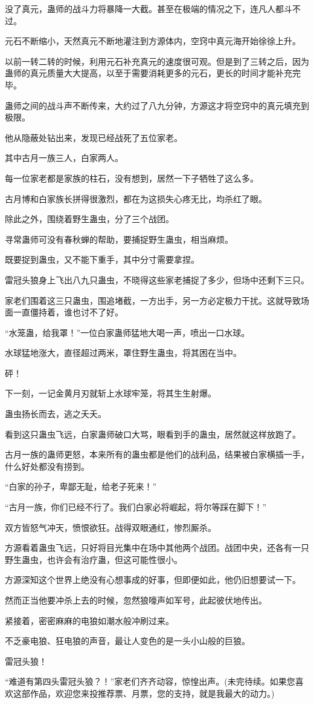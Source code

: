 \begin{this_body}
没了真元，蛊师的战斗力将暴降一大截。甚至在极端的情况之下，连凡人都斗不过。

元石不断缩小，天然真元不断地灌注到方源体内，空窍中真元海开始徐徐上升。

以前一转二转的时候，利用元石补充真元的速度很可观。但是到了三转之后，因为蛊师的真元质量大大提高，以至于需要消耗更多的元石，更长的时间才能补充完毕。

蛊师之间的战斗声不断传来，大约过了八九分钟，方源这才将空窍中的真元填充到极限。

他从隐蔽处钻出来，发现已经战死了五位家老。

其中古月一族三人，白家两人。

每一位家老都是家族的柱石，没有想到，居然一下子牺牲了这么多。

古月博和白家族长拼得很激烈，都在为这损失心疼无比，均杀红了眼。

除此之外，围绕着野生蛊虫，分了三个战团。

寻常蛊师可没有春秋蝉的帮助，要捕捉野生蛊虫，相当麻烦。

既要捉到蛊虫，又不能下重手，其中分寸需要拿捏。

雷冠头狼身上飞出八九只蛊虫，不晓得这些家老捕捉了多少，但场中还剩下三只。

家老们围着这三只蛊虫，围追堵截，一方出手，另一方必定极力干扰。这就导致场面一直僵持着，谁也讨不了好。

“水笼蛊，给我罩！”一位白家蛊师猛地大喝一声，喷出一口水球。

水球猛地涨大，直径超过两米，罩住野生蛊虫，将其困在当中。

砰！

下一刻，一记金黄月刃就斩上水球牢笼，将其生生射爆。

蛊虫扬长而去，逃之夭夭。

看到这只蛊虫飞远，白家蛊师破口大骂，眼看到手的蛊虫，居然就这样放跑了。

古月一族的蛊师更怒，本来所有的蛊虫都是他们的战利品，结果被白家横插一手，什么好处都没有捞到。

“白家的孙子，卑鄙无耻，给老子死来！”

“古月一族，你们已经不行了。我们白家必将崛起，将尔等踩在脚下！”

双方皆怒气冲天，愤恨欲狂。战得双眼通红，惨烈厮杀。

方源看着蛊虫飞远，只好将目光集中在场中其他两个战团。战团中央，还各有一只野生蛊虫，也许会有治疗蛊，但这可能性很小。

方源深知这个世界上绝没有心想事成的好事，但即便如此，他仍旧想要试一下。

然而正当他要冲杀上去的时候，忽然狼嚎声如军号，此起彼伏地传出。

紧接着，密密麻麻的电狼如潮水般冲刷过来。

不乏豪电狼、狂电狼的声音，最让人变色的是一头小山般的巨狼。

雷冠头狼！

“难道有第四头雷冠头狼？！”家老们齐齐动容，惊惶出声。(未完待续。如果您喜欢这部作品，欢迎您来投推荐票、月票，您的支持，就是我最大的动力。)

\end{this_body}

